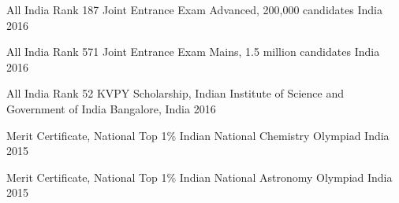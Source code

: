 
\begin{cvhonors}

  \cvhonor
    {All India Rank 187} %
    {Joint Entrance Exam Advanced, 200,000 candidates} %
    {India} %
    {2016} %

  \cvhonor
    {All India Rank 571} %
    {Joint Entrance Exam Mains, 1.5 million candidates} %
    {India} %
    {2016} %

  \cvhonor
    {All India Rank 52} %
    {KVPY Scholarship, Indian Institute of Science and Government of India} %
    {Bangalore, India} %
    {2016} %

  \cvhonor
    {Merit Certificate, National Top 1\%} %
    {Indian National Chemistry Olympiad} %
    {India} %
    {2015} %

  \cvhonor
    {Merit Certificate, National Top 1\%} %
    {Indian National Astronomy Olympiad} %
    {India} %
    {2015} %

\end{cvhonors}
